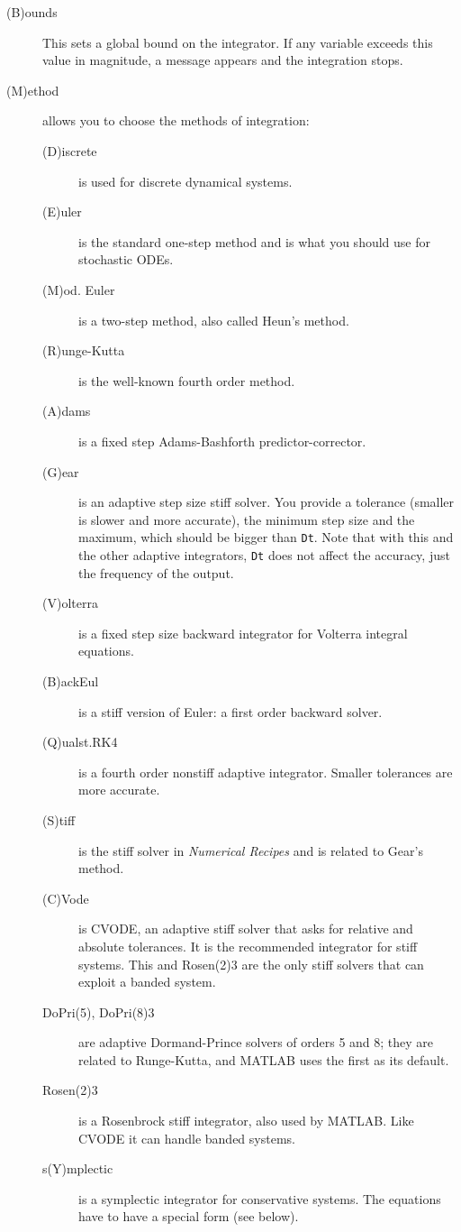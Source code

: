 \documentclass{article}
\newcommand{\tc}[1]{\addcontentsline{toc}{subsection}{#1}}
\begin{document}
\begin{description}
\item[(B)ounds]  This sets a global bound on the integrator.  If any variable exceeds
 this value in magnitude, a message appears and the integration stops.
\tc{Numerical method}\item[(M)ethod]  allows you to choose the methods of integration:
\begin{description}
\item[(D)iscrete] is used for discrete dynamical systems.
\item[(E)uler] is the standard one-step method and is what you should use for stochastic ODEs.
\item[(M)od. Euler] is a two-step method, also called Heun's method.
\item[(R)unge-Kutta] is the well-known fourth order method.
\item[(A)dams] is a fixed step Adams-Bashforth predictor-corrector.
\item[(G)ear] is an adaptive step size stiff solver.  You provide a tolerance (smaller is slower and more
accurate), the minimum step size and the maximum, which should be bigger than {\tt Dt}.  Note that with this and the other
adaptive integrators, {\tt Dt} does not affect the accuracy, just the frequency of the output.
\item[(V)olterra] is a fixed step size backward integrator for Volterra integral equations.
\item[(B)ackEul] is a stiff version of Euler: a first order backward solver.
\item[(Q)ualst.RK4] is a fourth order nonstiff adaptive integrator.  Smaller tolerances are more accurate.
\item[(S)tiff] is the stiff solver in {\it Numerical Recipes} and is related to Gear's method.
\item[(C)Vode] is CVODE, an adaptive stiff solver that asks for relative and absolute tolerances.  It is the recommended
integrator for stiff systems.  This and Rosen(2)3 are the only stiff solvers that can exploit a banded system.
\item[DoPri(5), DoPri(8)3] are adaptive Dormand-Prince solvers of orders 5 and 8; they are related to Runge-Kutta, and
MATLAB uses the first as its default.
\item[Rosen(2)3] is a Rosenbrock stiff integrator, also used by MATLAB.  Like CVODE it can handle banded systems.
\item[s(Y)mplectic] is a symplectic integrator for conservative systems.  The equations have to have a special form (see below).

\end{description}
\end{description}
\end{document}
